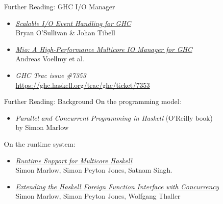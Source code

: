 \documentclass{beamer}
\begin{document}
\begin{frame}{Further Reading: GHC I/O Manager}
  \begin{itemize}
  \item \href{http://research.google.com/pubs/pub36841.html}{\emph{Scalable I/O Event Handling for GHC}}\\
    Bryan O'Sullivan \& Johan Tibell\\
  \item \href{http://haskell.cs.yale.edu/wp-content/uploads/2013/08/hask035-voellmy.pdf}{\emph{Mio:
        A High-Performance Multicore IO
        Manager for GHC}}\\
    Andreas Voellmy et al.\\
  \item \emph{GHC Trac issue \#7353}\\
    \url{https://ghc.haskell.org/trac/ghc/ticket/7353}
  \end{itemize}
\end{frame}

\begin{frame}{Further Reading: Background}
  On the programming model:
  \begin{itemize}
  \item
    \emph{Parallel and Concurrent Programming in Haskell} (O'Reilly book)\\
    by Simon Marlow
  \end{itemize}
  On the runtime system:
  \begin{itemize}
  \item
    \href{http://community.haskell.org/~simonmar/papers/multicore-ghc.pdf}{\emph{Runtime
    Support for Multicore Haskell}}\\
    Simon Marlow, Simon Peyton Jones, Satnam Singh.
  \item
    \href{http://community.haskell.org/~simonmar/papers/conc-ffi.pdf}{\emph{Extending
    the Haskell Foreign Function Interface with Concurrency}}\\
    Simon Marlow, Simon Peyton Jones, Wolfgang Thaller
  \end{itemize}
\end{frame}
\end{document}
